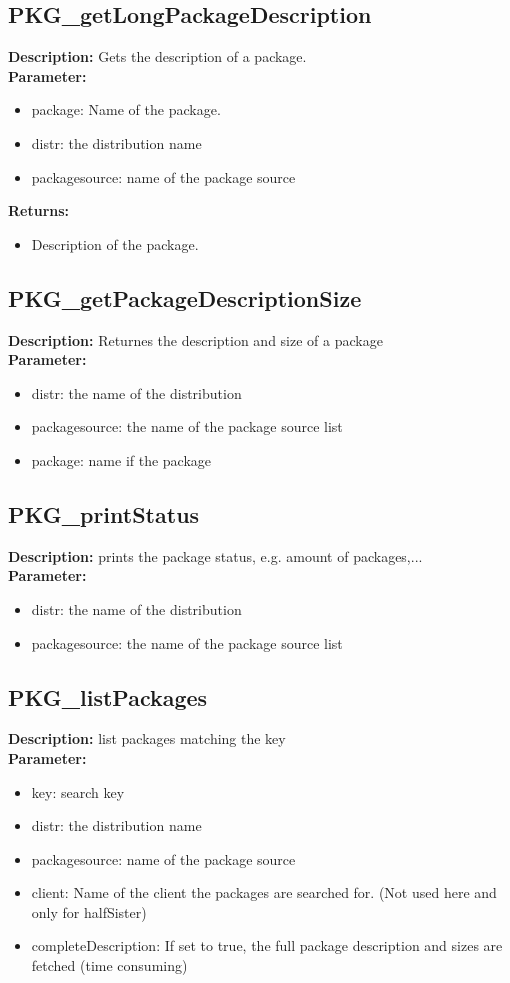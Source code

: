 \subsection{PKG\_getLongPackageDescription}
\textbf{Description:} Gets the description of a package.\\
\textbf{Parameter:}
\begin{itemize}
\item package: Name of the package.
\item distr: the distribution name
\item packagesource: name of the package source
\end{itemize}
\textbf{Returns:}
\begin{itemize}
\item Description of the package.
\end{itemize}

\subsection{PKG\_getPackageDescriptionSize}
\textbf{Description:} Returnes the description and size of a package\\
\textbf{Parameter:}
\begin{itemize}
\item distr: the name of the distribution
\item packagesource: the name of the package source list
\item package: name if the package
\end{itemize}

\subsection{PKG\_printStatus}
\textbf{Description:} prints the package status, e.g. amount of packages,...\\
\textbf{Parameter:}
\begin{itemize}
\item distr: the name of the distribution
\item packagesource: the name of the package source list
\end{itemize}

\subsection{PKG\_listPackages}
\textbf{Description:} list packages matching the key\\
\textbf{Parameter:}
\begin{itemize}
\item key: search key
\item distr: the distribution name
\item packagesource: name of the package source
\item client: Name of the client the packages are searched for. (Not used here and only for halfSister)
\item completeDescription: If set to true, the full package description and sizes are fetched (time consuming)
\end{itemize}

